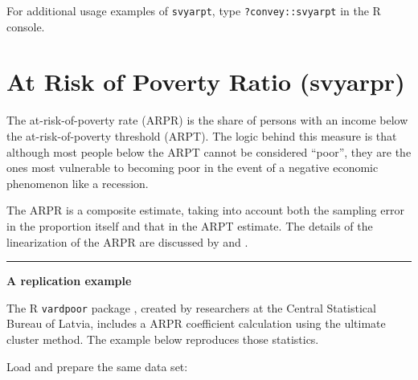 \documentclass[
]{book}
\begin{document}
For additional usage examples of \texttt{svyarpt}, type \texttt{?convey::svyarpt} in the R console.

\hypertarget{at-risk-of-poverty-ratio-svyarpr}{%
\section{At Risk of Poverty Ratio (svyarpr)}\label{at-risk-of-poverty-ratio-svyarpr}}

The at-risk-of-poverty rate (ARPR) is the share of persons with an income below the at-risk-of-poverty threshold (ARPT). The logic behind this measure is that although most people below the ARPT cannot be considered ``poor'', they are the ones most vulnerable to becoming poor in the event of a negative economic phenomenon like a recession.

The ARPR is a composite estimate, taking into account both the sampling error in the proportion itself and that in the ARPT estimate. The details of the linearization of the ARPR are discussed by \textcite{deville1999} and \textcite{osier2009}.

\begin{center}\rule{0.5\linewidth}{0.5pt}\end{center}

\textbf{A replication example}

The R \texttt{vardpoor} package \autocite{vardpoor}, created by researchers at the Central Statistical Bureau of Latvia, includes a ARPR coefficient calculation using the ultimate cluster method. The example below reproduces those statistics.

Load and prepare the same data set:
\end{document}
